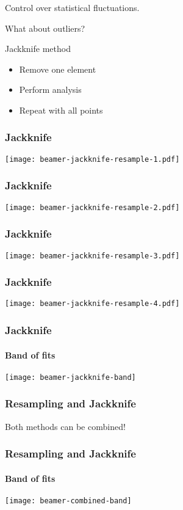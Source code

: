 \documentclass[english, fleqn]{beamer}
\begin{document}
\begin{frame}
    Control over statistical fluctuations.

    \pause

    \alert{What about outliers?}

    \pause

    \begin{block}{Jackknife method}
        \begin{itemize}
            \item Remove one element
            \item Perform analysis
            \item Repeat with all points
        \end{itemize}
    \end{block}
\end{frame}

\begin{frame}
    \frametitle{Jackknife}
    \centering
    \texttt{[image: beamer-jackknife-resample-1.pdf]}
\end{frame}

\begin{frame}
    \frametitle{Jackknife}
    \centering
    \texttt{[image: beamer-jackknife-resample-2.pdf]}
\end{frame}

\begin{frame}
    \frametitle{Jackknife}
    \centering
    \texttt{[image: beamer-jackknife-resample-3.pdf]}
\end{frame}

\begin{frame}
    \frametitle{Jackknife}
    \centering
    \texttt{[image: beamer-jackknife-resample-4.pdf]}
\end{frame}

\begin{frame}
    \frametitle{Jackknife}
    \framesubtitle{Band of fits}
    \centering
    \texttt{[image: beamer-jackknife-band]}
\end{frame}

\begin{frame}
    \frametitle{Resampling and Jackknife}

    Both methods can be combined!
\end{frame}

\begin{frame}
    \frametitle{Resampling and Jackknife}
    \framesubtitle{Band of fits}
    \centering
    \texttt{[image: beamer-combined-band]}
\end{frame}
\end{document}
